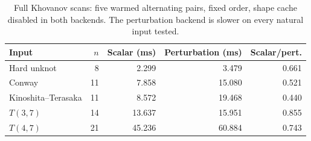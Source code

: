 \begin{table}[htbp]
\centering\small
\setlength{\tabcolsep}{4pt}
\begin{tabular}{lrrrr}
\toprule
Input & $n$ & Scalar (ms) & Perturbation (ms) & Scalar/pert. \\
\midrule
Hard unknot & 8 & 2.299 & 3.479 & 0.661 \\
Conway & 11 & 7.858 & 15.080 & 0.521 \\
Kinoshita--Terasaka & 11 & 8.572 & 19.468 & 0.440 \\
$T(3,7)$ & 14 & 13.637 & 15.951 & 0.855 \\
$T(4,7)$ & 21 & 45.236 & 60.884 & 0.743 \\
\bottomrule
\end{tabular}
\caption{Full Khovanov scans: five warmed alternating pairs, fixed order, shape cache disabled in both backends. The perturbation backend is slower on every natural input tested.}
\label{tab:hpl-natural}
\end{table}
